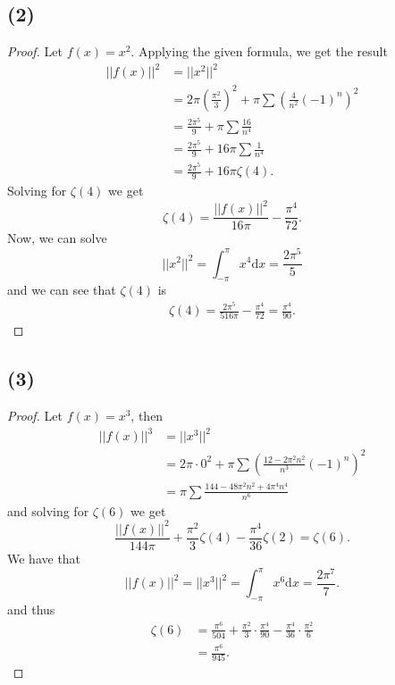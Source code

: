 \documentclass{article}
\begin{document}
\subsection*{(2)}
\begin{proof}
  Let $f(x) = x^2$. Applying the given formula, we get the result
  \begin{align*}
    ||f(x)||^2 &= ||x^2||^2 \\
    &= 2 \pi \left(\frac{\pi^2}{3}\right)^2 + \pi \sum\left(\frac{4}{n^2}(-1)^n \right)^2 \\
    &= \frac{2\pi^5}{9} + \pi \sum \frac{16}{n^4}\\
    &= \frac{2 \pi^5}{9} + 16 \pi \sum \frac{1}{n^4} \\
    &= \frac{2 \pi^5}{9} + 16 \pi \zeta(4).
  \end{align*}
  Solving for $\zeta(4)$ we get 
  \[
  \zeta(4) = \frac{||f(x)||^2}{16 \pi} - \frac{\pi^4}{72}.
  \]
  Now, we can solve 
  \[
  ||x^2||^2 = \int_{-\pi}^{\pi}x^4 \mathrm{d}x = \frac{2 \pi^5}{5}  
  \]
  and we can see that $\zeta(4)$ is 
  \begin{align*}
    \zeta(4) = \frac{2 \pi^5}{516 \pi} - \frac{\pi^4}{72} = \frac{\pi^4}{90}.
  \end{align*}
\end{proof}
\subsection*{(3)}
\begin{proof}
 Let $f(x) = x^3$, then 
 \begin{align*}
  ||f(x)||^3 &= ||x^3||^2 \\
   &= 2 \pi \cdot 0^2 + \pi \sum \left(\frac{12 - 2 \pi^2 n^2}{n^3}(-1)^n \right)^2 \\
   &= \pi \sum \frac{144 - 48\pi^2n^2 + 4 \pi^4n^4}{n^6}
 \end{align*} 
 and solving for $\zeta(6)$ we get 
 \[
 \frac{||f(x)||^2}{144 \pi} + \frac{\pi^2}{3}\zeta(4) -\frac{\pi^4}{36}\zeta(2) = \zeta(6).  
 \]
 We have that 
 \[
  ||f(x)||^2 = ||x^3||^2 = \int_{-\pi}^{\pi}x^6\mathrm{d}x = \frac{2 \pi^7}{7}.
 \]
 and thus 
 \begin{align*}
  \zeta(6) &= \frac{\pi^6}{504} + \frac{\pi^2}{3}\cdot \frac{\pi^4}{90} - \frac{\pi^4}{36}\cdot \frac{\pi^2}{6} \\ &= \frac{\pi^6}{945}.
 \end{align*}
\end{proof}
\end{document}
